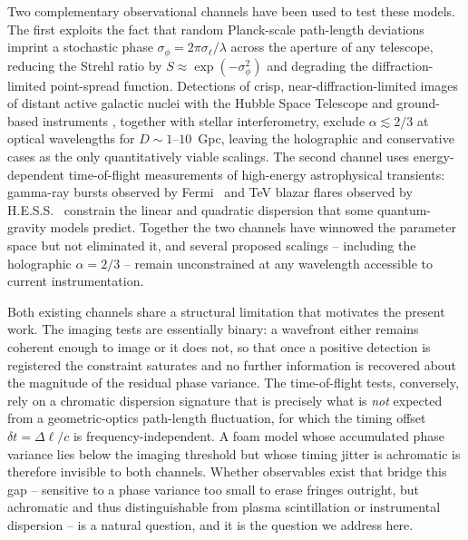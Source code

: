 Two complementary observational channels have been used to test these models.
The first exploits the fact that random Planck-scale path-length deviations
imprint a stochastic phase $\sigma_\phi = 2\pi\sigma_\ell/\lambda$ across the
aperture of any telescope, reducing the Strehl ratio by
$S \approx \exp(-\sigma_\phi^2)$ and degrading the diffraction-limited
point-spread function.
Detections of crisp, near-diffraction-limited images of distant active galactic
nuclei with the Hubble Space Telescope and ground-based instruments
\cite{LieuHillman2003,2003ApJ...587L...1R,Christiansen2011,Perlman2015},
together with stellar interferometry, exclude $\alpha \lesssim 2/3$ at optical
wavelengths for $D \sim 1$--$10$~Gpc, leaving the holographic and conservative
cases as the only quantitatively viable scalings.
The second channel uses energy-dependent time-of-flight measurements of
high-energy astrophysical transients: gamma-ray bursts observed by
Fermi~\cite{Fermi2009} and TeV blazar flares observed by
H.E.S.S.~\cite{HESS2008} constrain the linear and quadratic dispersion that
some quantum-gravity models predict.
Together the two channels have winnowed the parameter space but not eliminated
it, and several proposed scalings -- including the holographic $\alpha = 2/3$
-- remain unconstrained at any wavelength accessible to current instrumentation.

Both existing channels share a structural limitation that motivates the
present work.
The imaging tests are essentially binary: a wavefront either remains coherent
enough to image or it does not, so that once a positive detection is registered
the constraint saturates and no further information is recovered about the
magnitude of the residual phase variance.
The time-of-flight tests, conversely, rely on a chromatic dispersion signature
that is precisely what is \emph{not} expected from a geometric-optics
path-length fluctuation, for which the timing offset $\delta t = \Delta\ell/c$
is frequency-independent.
A foam model whose accumulated phase variance lies below the imaging threshold
but whose timing jitter is achromatic is therefore invisible to both channels.
Whether observables exist that bridge this gap -- sensitive to a phase variance
too small to erase fringes outright, but achromatic and thus distinguishable
from plasma scintillation or instrumental dispersion -- is a natural question,
and it is the question we address here.

